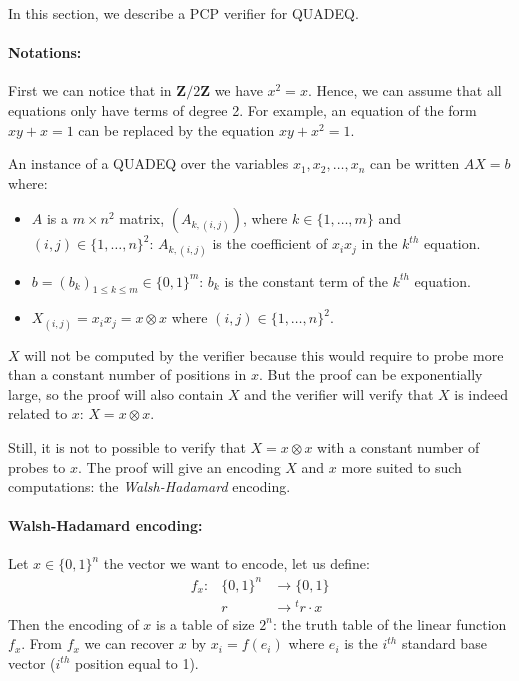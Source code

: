 \documentclass[a4paper,10pt]{article}
\theoremstyle{remark}
\begin{document}
In this section, we describe a PCP verifier for \textsf{QUADEQ}. 

\paragraph{Notations:} First we can notice that in $\mathbf{Z}/2\mathbf{Z}$ we
have $x^2=x$. Hence, we can assume that all equations only have terms of degree
2. For example, an equation of the form $xy + x =1 $ can be replaced by the
equation $xy + x^2=1$.

An instance of a \textsf{QUADEQ} over the variables $x_1,x_2,\ldots,x_n$ can be
written $AX=b$ where:
\begin{itemize}
\item $A$ is a $m \times n^2$ matrix, $(A_{k,( i, j)})$, where
$k\in\{1,\ldots,m\}$ and $(i,j)\in\{1,\ldots,n\}^2$: $ A_{k,( i, j)}$ is the
coefficient of $x_ix_j$ in the $k^{th}$ equation.
\item  $b = (b_k)_{1\leq k\leq m}\in\{0,1\}^m$: $b_k$
is the constant term of the $k^{th}$ equation.
\item $X_{( i, j)}=x_{i}x_{j}=x\otimes x$ where $(i,j)\in\{1,\ldots,n\}^2$.
\end{itemize}

$X$ will not be computed by the verifier because this would require to probe
more than a constant number of positions in $x$. But the proof can be
exponentially large, so the proof will also contain $X$ and the verifier will
verify that $X$ is indeed related to $x$: $X=x\otimes x$.

Still, it is not to possible to verify that $X=x\otimes x$ with a constant
number of probes to $x$. The proof will give an encoding $X$ and $x$ more
suited to such computations: the \emph{Walsh-Hadamard} encoding.

\paragraph{Walsh-Hadamard encoding:} Let $x\in\{0,1\}^n$ the vector we want to
encode, let us define:
\begin{displaymath}
\begin{array}{rrl}
f_x:&\{0,1\}^n&\longrightarrow\{0,1\}\\
&r&\longrightarrow{}^tr\cdot x
\end{array}
\end{displaymath}
Then the encoding of $x$ is a table of size $2^n$: the truth table of the
linear function $f_x$. From $f_x$ we can recover $x$ by $x_i=f(e_i)$ where $e_i$
is the $i^{th}$ standard base vector ($i^{th}$ position equal to 1).
\end{document}

